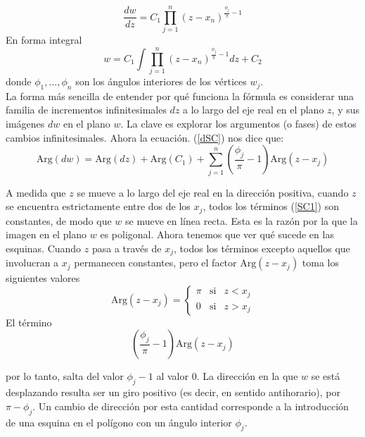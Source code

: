 \begin{equation}\label{dSC}
	\frac{dw}{dz}=C_1\prod_{j=1}^{n}(z-x_n)^{\frac{\phi_j}{\pi}-1}
\end{equation}
En forma integral
\begin{equation}\label{eSC}
	w=C_1\int \prod_{j=1}^{n}(z-x_n)^{\frac{\phi_j}{\pi}-1} dz +C_2
\end{equation}
donde $\phi_1,\ldots,\phi_n$ son los ángulos interiores de los vértices $w_j$.\\
La forma más sencilla de entender por qué funciona la fórmula es considerar una familia de incrementos infinitesimales $dz$ a lo largo del eje real en el plano $z$, y sus imágenes $dw$ en el plano $w$. La clave es explorar los argumentos (o fases) de estos cambios infinitesimales. Ahora la ecuación. (\ref{dSC}) nos dice que:
\begin{equation}\label{SC1}
	\mbox{Arg}(dw)=\mbox{Arg}(dz)+\mbox{Arg}(C_1)+\sum_{j=1}^{n}\left(\frac{\phi_j}{\pi}-1\right)\mbox{Arg}(z-x_j)
\end{equation}

A medida que $z$ se mueve a lo largo del eje real en la dirección positiva, cuando $z$ se encuentra estrictamente entre dos de los $x_j$,  todos los términos (\ref{SC1}) son constantes, de modo que $w$ se mueve en línea recta.
Esta es la razón por la que la imagen en el plano $w$ es poligonal. Ahora tenemos que ver qué sucede en las esquinas. Cuando $z$ pasa a través de $x_j$, todos los términos excepto aquellos que involucran a $x_j$ permanecen constantes, pero el factor $\mbox{Arg}(z-x_j)$ toma los siguientes valores
\[
	\mbox{Arg}(z-x_j)=\left\{\begin{array}{ccr}
		\pi &\mbox{si}&z<x_j\\
		0&\mbox{si}& z>x_j
	\end{array} \right.
\]
El término 
$$\left(\frac{\phi_j}{\pi}-1\right) \mbox{Arg}(z-x_j)$$



por lo tanto, salta del valor $\phi_j-1$ al valor $0$. La dirección en la que $w$ se está desplazando resulta ser un giro positivo (es decir, en sentido antihorario), por $\pi -\phi_j$. Un cambio de dirección por esta cantidad corresponde a la introducción de una esquina en el polígono con un ángulo interior $\phi_j$.\\

